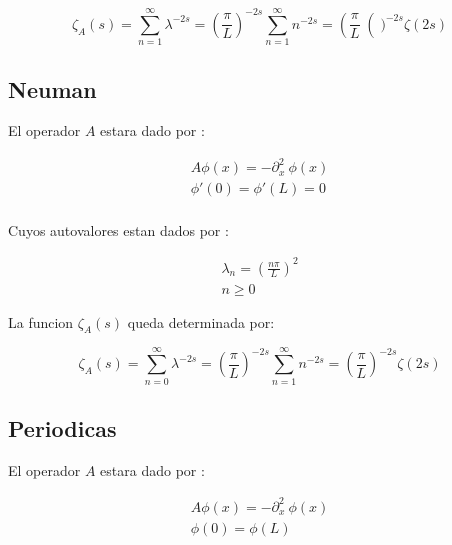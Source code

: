 \begin{equation}
\zeta _A (s) = 
\sum _{n=1} ^{\infty} \lambda ^{-2s} =  
\left( \frac{\pi}{L} \right) ^{-2s} \sum _{n=1} ^{\infty} n ^{-2s} = 
\left( \frac{\pi}{L} \right() ^{-2s} \zeta (2s)
\end{equation}

\subsection{Neuman}

El operador $A$ estara dado por : 

\begin{equation}
\begin{array}{c}
    A \phi (x) = - \partial ^2 _x \ \phi (x)  \\
    \phi ' (0) = \phi ' (L) = 0 \\ 
\end{array}
\end{equation}

Cuyos autovalores estan dados por  : 

\begin{equation}
\begin{array}{c}
	\lambda _n = \left( \frac{n \pi }{L} \right) ^2 \\
	n \geq 0
\end{array}
\end{equation}

La funcion $\zeta _A (s)$ queda determinada por:

\begin{equation}
\zeta _A (s) = 
\sum _{n=0} ^{\infty} \lambda ^{-2s} =  
\left( \frac{\pi}{L} \right) ^{-2s} \sum _{n=1} ^{\infty} n ^{-2s} = 
\left( \frac{\pi}{L} \right) ^{-2s} \zeta (2s)
\end{equation}

\subsection{Periodicas}

El operador $A$ estara dado por : 

\begin{equation}
\begin{array}{c}
    A \phi (x) = - \partial ^2 _x \ \phi (x)  \\
    \phi (0) = \phi (L)  \\ 
\end{array}
\end{equation}

